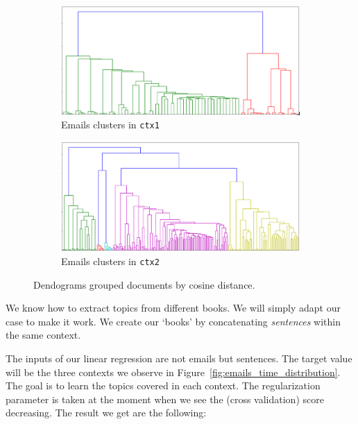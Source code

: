 \documentclass[11pt]{article}
\begin{document}
\begin{figure}[!t]
	\centering
	\begin{subfigure}[b]{0.4\linewidth}
		\centering
		\includegraphics[width=\linewidth]{images/dendogram_ctx1.png}
		\caption[]%
		{{\small Emails clusters in \texttt{ctx1}}}
		\label{fig:dendogram_ctx1}
	\end{subfigure}
	\begin{subfigure}[b]{0.4\linewidth}
		\centering
		\includegraphics[width=\linewidth]{images/dendogram_ctx2.png}
		\caption[]%
		{{\small Emails clusters in \texttt{ctx2}}}
		\label{fig:dendogram_ctx2}
	\end{subfigure}
	\caption{Dendograms grouped documents by cosine distance.}
	\label{fig:dendograms}
\end{figure}

We know how to extract topics from different books. We will simply adapt our case to make it work. We create our `books' by concatenating \emph{sentences} within the same context.

The inputs of our linear regression are not emails but sentences. The target value will be the three contexts we observe in Figure~\ref{fig:emails_time_distribution}. The goal is to learn the topics covered in each context. The regularization parameter is taken at the moment when we see the (cross validation) score decreasing. The result we get are the following:
\end{document}
